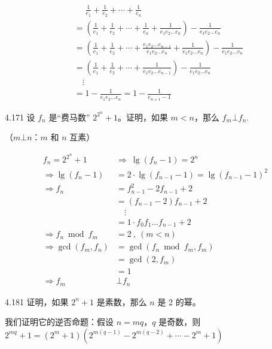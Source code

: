 \begin{align*}
  &\phantom{=} \frac{1}{e_1} + \frac{1}{e_2} + \cdots + \frac{1}{e_n} \\
  &= (\frac{1}{e_1} + \frac{1}{e_2} + \cdots + \frac{1}{e_n} + \frac{1}{e_1 e_2 \dots e_n}) - \frac{1}{e_1 e_2 \dots e_n} \\
  &= (\frac{1}{e_1} + \frac{1}{e_2} + \cdots + \frac{e_1 e_2 \dots e_{n-1}}{e_1 e_2 \dots e_n} + \frac{1}{e_1 e_2 \dots e_n}) - \frac{1}{e_1 e_2 \dots e_n} \\
  &= (\frac{1}{e_1} + \frac{1}{e_2} + \cdots + \frac{1}{e_1 e_2 \dots e_{n-1}}) - \frac{1}{e_1 e_2 \dots e_n} \\
  & \quad \vdots \\
  &= 1 - \frac{1}{e_1 e_2 \dots e_n} = 1 - \frac{1}{e_{n+1} -1}
\end{align*}

\begin{problem}{4.17}{1}
  设 \( f_n \) 是“费马数” \( 2^{2^n} + 1 \)。证明，如果 \( m<n \)，那么 \( f_m \bot f_n \).
\end{problem}

（\( m \bot n \)：\( m \) 和 \( n \) 互素）

\begin{align*}
  f_n = 2^{2^n} + 1 \ &\Rightarrow \ \lg{(f_n-1)} = 2^n \\
  \Rightarrow \lg{(f_n-1)} &= 2 \cdot \lg{(f_{n-1}-1)} = \lg{(f_{n-1}-1)^2} \\
  \Rightarrow f_n &= f_{n-1}^2 - 2 f_{n-1} + 2 \\
  &= (f_{n-1} - 2) f_{n-1} + 2 \\
  & \quad \vdots \\
  &= 1 \cdot f_0 f_1 \dots f_{n-1} + 2 \\[8pt]
  \Rightarrow f_n \bmod f_m &= 2 \ , \ (m < n) \\
  \Rightarrow \gcd(f_m, f_n) &= \gcd(f_n \bmod f_m, f_m) \\
  &= \gcd(2, f_m) \\
  &= 1 \\
  \Rightarrow f_m &\bot f_n
\end{align*}

\begin{problem}{4.18}{1}
  证明，如果 \( 2^n+1 \) 是素数，那么 \( n \) 是 2 的幂。
\end{problem}

我们证明它的逆否命题：假设 \( n = mq \)，\( q \) 是奇数，则 \( 2^{mq} + 1 = (2^m + 1) (2^{m(q-1)} - 2^{m(q-2)} + \cdots - 2^m + 1) \)

